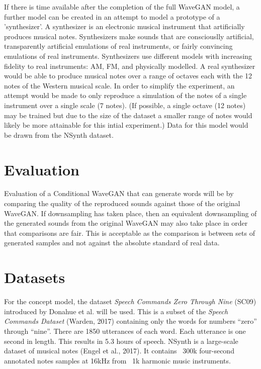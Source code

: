 \documentclass{article}
\begin{document}
If there is time available after the completion of the full WaveGAN model, a further model can be created in an attempt to model a prototype of a 'synthesizer'.
A synthesizer is an electronic musical instrument that artificially produces musical notes.
Synthesizers make sounds that are consciouslly artificial, transparently artificial emulations of real instruments, or fairly convincing emulations of real instruments.
Synthesizers use different models with increasing fidelity to real instruments: AM, FM, and physically modelled.
\newline
\newline
A real synthesizer would be able to produce musical notes over a range of octaves each with the 12 notes of the Western musical scale.
In order to simplify the experiment, an attempt would be made to only reproduce a simulation of the notes of a single instrument over a single scale (7 notes).
(If possible, a single octave (12 notes) may be trained but due to the size of the dataset a smaller range of notes would likely be more attainable for this intial experiment.)
\newline
\newline
Data for this model would be drawn from the NSynth dataset.

\section{Evaluation}

Evaluation of a Conditional WaveGAN that can generate words will be by comparing the quality of the reproduced sounds against those of the original WaveGAN.
If downsampling has taken place, then an equivalent downsampling of the generated sounds from the original WaveGAN may also take place in order that comparisons are fair.
This is acceptable as the comparison is between sets of generated samples and not against the absolute standard of real data.

\section{Datasets}

For the concept model, the dataset \textit{Speech Commands Zero Through Nine} (SC09) introduced by Donahue et al. will be used.
This is a subset of the \textit{Speech Commands Dataset} (Warden, 2017) containing only the words for numbers ``zero'' through ``nine''.
There are 1850 utterances of each word.
Each utterance is one second in length.
This results in 5.3 hours of speech.
\newline
\newline
NSynth is a large-scale dataset of musical notes (Engel et al., 2017).
It contains ~300k four-second annotated notes samples at 16kHz from ~1k harmonic music instruments.
\end{document}

